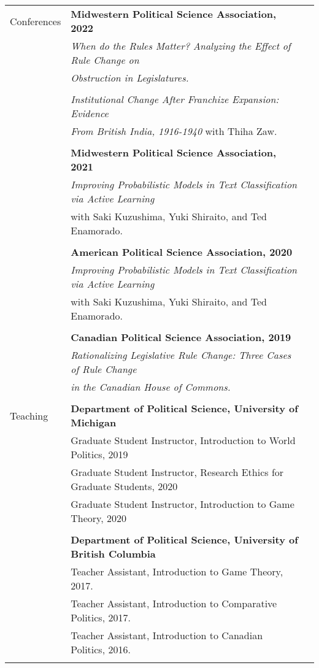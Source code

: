 \documentclass[letterpaper,11pt,oneside]{article}
\begin{document}
\begin{tabular}{@{} l l l}
  \Large{Conferences} & \textbf{Midwestern Political Science Association, 2022} \\
                      & \textit{When do the Rules Matter? Analyzing the Effect of Rule Change on} \\
                      & \textit{Obstruction in Legislatures.}\\
  \\
                      & \textit{Institutional Change After Franchize Expansion: Evidence} \\
                      & \textit{From British India, 1916-1940} with Thiha Zaw.\\
  \\
                      & \textbf{Midwestern Political Science Association, 2021} \\
                      & \textit{Improving Probabilistic Models in Text Classification via Active Learning} \\
                      & with Saki Kuzushima, Yuki Shiraito, and Ted Enamorado.\\
  \\
                      & \textbf{American Political Science Association, 2020} \\
                      & \textit{Improving Probabilistic Models in Text Classification via Active Learning} \\
                      & with Saki Kuzushima, Yuki Shiraito, and Ted Enamorado.\\
  \\
                      & \textbf{Canadian Political Science Association, 2019} \\
                      & \textit{Rationalizing Legislative Rule Change: Three Cases of Rule Change} \\
                      & \textit{in the Canadian House of Commons.} \\
  \\

  \Large{Teaching}
                      & \textbf{Department of Political Science, University of Michigan} \\
                      & Graduate Student Instructor, Introduction to World Politics, 2019 \\
                      & Graduate Student Instructor, Research Ethics for Graduate Students, 2020 \\
                      & Graduate Student Instructor, Introduction to Game Theory, 2020 \\
  \\
                      & \textbf{Department of Political Science, University of British Columbia} \\
                      & Teacher Assistant, Introduction to Game Theory, 2017. \\
                      & Teacher Assistant, Introduction to Comparative Politics, 2017. \\
                      & Teacher Assistant, Introduction to Canadian Politics, 2016. \\
                      & \\


\end{tabular}

\vspace{2em}
\end{document}
